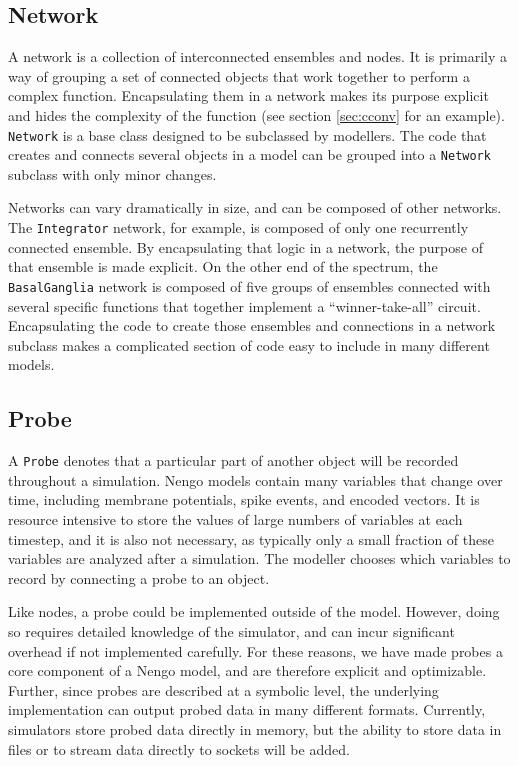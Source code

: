 \documentclass{frontiersSCNS}
\begin{document}
\subsection{Network}

A network is a collection of interconnected ensembles and nodes.
It is primarily a way of grouping
a set of connected objects
that work together to perform a complex function.
Encapsulating them in a network
makes its purpose explicit
and hides the complexity of the function
(see section \ref{sec:cconv} for an example).
\texttt{Network} is a base class designed to be
subclassed by modellers.
The code that creates and connects
several objects in a model can be
grouped into a \texttt{Network} subclass
with only minor changes.

Networks can vary dramatically in size,
and can be composed of other networks.
The \texttt{Integrator} network, for example,
is composed of only one recurrently connected ensemble.
By encapsulating that logic in a network,
the purpose of that ensemble is made explicit.
On the other end of the spectrum,
the \texttt{BasalGanglia} network
is composed of five groups of ensembles
connected with several specific functions
that together implement a ``winner-take-all'' circuit.
Encapsulating the code to create those ensembles
and connections in a network subclass
makes a complicated section of code
easy to include in many different models.

\subsection{Probe}

A \texttt{Probe} denotes that
a particular part of another object
will be recorded throughout a simulation.
Nengo models contain many variables
that change over time,
including membrane potentials,
spike events, and encoded vectors.
It is resource intensive to store the values of
large numbers of variables
at each timestep, and it is also not necessary,
as typically only a small fraction
of these variables are analyzed after a simulation.
The modeller chooses which variables to
record by connecting a probe to an object.

Like nodes, a probe could be implemented
outside of the model.
However, doing so requires detailed knowledge
of the simulator,
and can incur significant overhead
if not implemented carefully.
For these reasons, we have made probes
a core component of a Nengo model,
and are therefore explicit
and optimizable.
Further, since probes are described
at a symbolic level,
the underlying implementation
can output probed data in many different formats.
Currently, simulators store probed data
directly in memory,
but the ability to store data
in files or to stream data
directly to sockets will be added.
\end{document}
